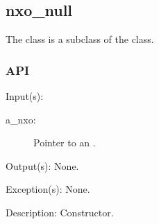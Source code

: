 %
%
%
%
%

\subsection{nxo\_null}
\label{nxo_null}

The  class is a subclass of the  class.

\subsubsection{API}
\begin{capi}
\label{nxo_null_new}
	\begin{capilist}
	\item[Input(s): ]
		\begin{description}\item[]
		\item[a\_nxo: ]
			Pointer to an .
		\end{description}
	\item[Output(s): ] None.
	\item[Exception(s): ] None.
	\item[Description: ]
		Constructor.
	\end{capilist}
\end{capi}
